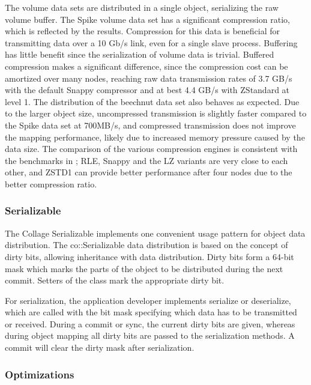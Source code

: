 The volume data sets are distributed in a single object, serializing the raw
volume buffer. The Spike volume data set has a significant compression ratio,
which is reflected by the results. Compression for this data is beneficial for
transmitting data over a 10 Gb/s link, even for a single slave process.
Buffering has little benefit since the serialization of volume data is trivial.
Buffered compression makes a significant difference, since the compression cost
can be amortized over many nodes, reaching raw data transmission rates of 3.7
GB/s with the default Snappy compressor and at best 4.4 GB/s with ZStandard at
level 1. The distribution of the beechnut data set also behaves as expected.
Due to the larger object size, uncompressed transmission is slightly faster
compared to the Spike data set at 700MB/s, and compressed transmission does not
improve the mapping performance, likely due to increased memory pressure caused
by the data size. The comparison of the various compression engines is
consistent with the benchmarks in ; RLE, Snappy and the
LZ variants are very close to each other, and ZSTD1 can provide better
performance after four nodes due to the better compression ratio.

\subsubsection{Serializable}

\label{sec:Serializable}The \textsf{Collage} Serializable implements one
convenient usage pattern for object data distribution. The
\textsf{co::Serializable} data distribution is based on the concept of dirty
bits, allowing inheritance with data distribution. Dirty bits form a 64-bit
mask which marks the parts of the object to be distributed during the next
commit. Setters of the class mark the appropriate dirty bit.

For serialization, the application developer implements \textsf{serialize} or
\textsf{deserialize}, which are called with the bit mask specifying which data
has to be transmitted or received. During a commit or sync, the current dirty
bits are given, whereas during object mapping all dirty bits are passed to the
serialization methods. A commit will clear the dirty mask after serialization.

\subsubsection{Optimizations}

